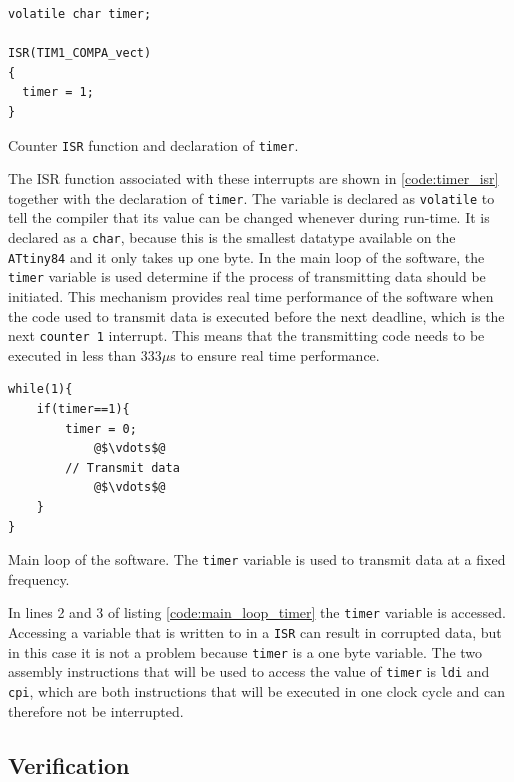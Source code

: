 {\begin{listing}[H] 
\begin{verbatim}
volatile char timer;

ISR(TIM1_COMPA_vect)
{ 
  timer = 1;
}
\end{verbatim}
\caption{Counter \texttt{ISR} function and declaration of \texttt{timer}.}
\label{code:timer_isr}
\end{listing}

The ISR function associated with these interrupts are shown in \ref{code:timer_isr} together with the declaration of \texttt{timer}.
The variable is declared as \texttt{volatile} to tell the compiler that its value can be changed whenever during run-time. 
It is declared as a \texttt{char}, because this is the smallest datatype available on the \texttt{ATtiny84} and it only takes up one byte. 
In the main loop of the software, the \texttt{timer} variable is used determine if the process of transmitting data should be initiated.
This mechanism provides real time performance of the software when the code used to transmit data is executed before the next deadline, which is the next \texttt{counter 1} interrupt.
This means that the transmitting code needs to be executed in less than 333$\mu$s to ensure real time performance.

\begin{listing}[H] 
\begin{verbatim}
while(1){
    if(timer==1){ 
      	timer = 0;
      		@$\vdots$@
      	// Transmit data
			@$\vdots$@      
	}
}
\end{verbatim}
\caption{Main loop of the software. The \texttt{timer} variable is used to transmit data at a fixed frequency.} 
\label{code:main_loop_timer}
\end{listing}
In lines 2 and 3 of listing \ref{code:main_loop_timer} the \texttt{timer} variable is accessed.  
Accessing a variable that is written to in a \texttt{ISR} can result in corrupted data, but in this case it is not a problem because \texttt{timer} is a one byte variable. 
The two assembly instructions that will be used to access the value of \texttt{timer} is \texttt{ldi} and \texttt{cpi}, which are both instructions that will be executed in one clock cycle and can therefore not be interrupted.

\subsection{Verification} %
\label{sub:verification}


}
